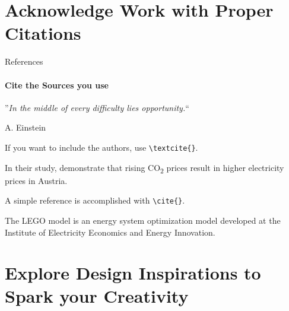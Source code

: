 \documentclass[aspectratio=169]{beamer}
\begin{document}
\section{\textbf{Acknowledge} Work with Proper \textbf{Citations}}

\begin{frame}
    \agenda     
\end{frame}


\begin{frame}{References}
    \framesubtitle{Cite the Sources you use}

    \begin{coloredblock}[grey]
        \centering
        ”\textit{In the middle of every difficulty lies opportunity.}“
          
        \vspace{0.7cm}
        \scriptsize A. Einstein \cite{einstein2018}
    \end{coloredblock}
    
    \begin{coloredblock}
        If you want to include the authors, use \texttt{\textbackslash textcite\{\}}.
    
        \vspace{0.5cm}
        In their study, \textbf{\textcite{gaugl2023}} demonstrate that rising CO\textsubscript{2} prices result in higher electricity prices in Austria.
    \end{coloredblock}
    
    \begin{coloredblock}
        A simple reference is accomplished with \texttt{\textbackslash cite\{\}}.
    
        \vspace{0.5cm}
        The LEGO model is an energy system optimization model developed at the Institute of Electricity Economics and Energy Innovation. \textbf{\cite{wogrin2022}}
    \end{coloredblock}

\end{frame}


\section{Explore \textbf{Design Inspirations} to Spark  your Creativity}
\end{document}
